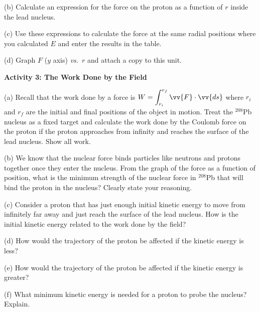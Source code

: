 \pagebreak[2]
(b) Calculate an expression for the force on the proton as a function
of $r$ inside the lead nucleus.
\answerspace{25mm}

(c) Use these expressions to calculate the force at the same radial
positions where you calculated $E$ and enter the results in the table.

(d) Graph $F$ ($y$ axis) \textit{vs.}~$r$ and attach a copy to this unit.
\answerspace{10mm}

\textbf{Activity 3: The Work Done by the Field}

(a) Recall that the work done by a force is $\displaystyle W=\int ^{r_{f}}_{r_{i}}\vv{F}\cdot \vv{ds}$
where $r_{i}$ and $r_f$ are the initial and final positions
of the object in motion. Treat the \( ^{208} \)Pb nucleus as a fixed
target and calculate the work done by the Coulomb force on the proton
if the proton approaches from infinity and reaches the surface of
the lead nucleus. Show all work.
\answerspace{35mm}

(b) We know that the nuclear force binds particles like neutrons and
protons together once they enter the nucleus. From the graph of the
force as a function of position, what is the minimum strength of the
nuclear force in \( ^{208} \)Pb that will bind the proton in the
nucleus? Clearly state your reasoning.
\answerspace{12mm}

(c) Consider a proton that has just enough initial kinetic energy
to move from infinitely far away and just reach the surface of the
lead nucleus. How is the initial kinetic energy related to the work
done by the field?
\answerspace{12mm}

(d) How would the trajectory of the proton be affected if the kinetic
energy is less?
\answerspace{12mm}

(e) How would the trajectory of the proton be affected if the kinetic
energy is greater?
\answerspace{12mm}

(f) What minimum kinetic energy is needed for a proton to probe the
nucleus? Explain.
\answerspace{15mm}

